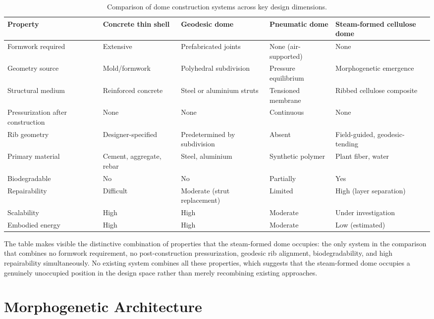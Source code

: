 \documentclass[12pt,a4paper]{article}
\begin{document}
\begin{table}[ht]
\centering
\caption{Comparison of dome construction systems across key design dimensions.}
\label{tab:comparison}
\begin{tabular}{p{3.2cm}p{2.8cm}p{2.8cm}p{2.8cm}p{2.8cm}}
\toprule
Property & Concrete thin shell & Geodesic dome & Pneumatic dome & Steam-formed cellulose dome \\
\midrule
Formwork required & Extensive & Prefabricated joints & None (air-supported) & None \\
Geometry source & Mold/formwork & Polyhedral subdivision & Pressure equilibrium & Morphogenetic emergence \\
Structural medium & Reinforced concrete & Steel or aluminium struts & Tensioned membrane & Ribbed cellulose composite \\
Pressurization after construction & None & None & Continuous & None \\
Rib geometry & Designer-specified & Predetermined by subdivision & Absent & Field-guided, geodesic-tending \\
Primary material & Cement, aggregate, rebar & Steel, aluminium & Synthetic polymer & Plant fiber, water \\
Biodegradable & No & No & Partially & Yes \\
Repairability & Difficult & Moderate (strut replacement) & Limited & High (layer separation) \\
Scalability & High & High & Moderate & Under investigation \\
Embodied energy & High & High & Moderate & Low (estimated) \\
\bottomrule
\end{tabular}
\end{table}

The table makes visible the distinctive combination of properties that
the steam-formed dome occupies: the only system in the comparison that
combines no formwork requirement, no post-construction pressurization,
geodesic rib alignment, biodegradability, and high repairability
simultaneously. No existing system combines all these properties, which
suggests that the steam-formed dome occupies a genuinely unoccupied
position in the design space rather than merely recombining existing
approaches.

\section{Morphogenetic Architecture}
\end{document}
